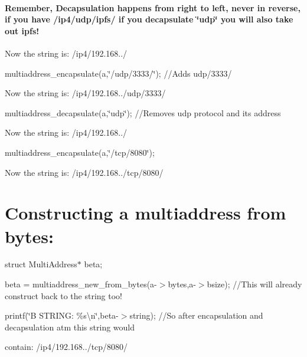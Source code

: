 \paragraph*{Remember, Decapsulation happens from right to left, never in reverse, if you have /ip4/udp/ipfs/ if you decapsulate \char`\"{}udp\char`\"{} you will also take out ipfs!}


\begin{DoxyItemize}
\item Now the string is\+: /ip4/192.168../
\item multiaddress\+\_\+encapsulate(a,\char`\"{}/udp/3333/\char`\"{}); //\+Adds udp/3333/
\item Now the string is\+: /ip4/192.168../udp/3333/
\item multiaddress\+\_\+decapsulate(a,\char`\"{}udp\char`\"{}); //\+Removes udp protocol and its address
\item Now the string is\+: /ip4/192.168../
\item multiaddress\+\_\+encapsulate(a,\char`\"{}/tcp/8080\char`\"{});
\item Now the string is\+: /ip4/192.168../tcp/8080/
\end{DoxyItemize}

\section*{Constructing a multiaddress from bytes\+:}


\begin{DoxyItemize}
\item struct Multi\+Address$\ast$ beta;
\item beta = multiaddress\+\_\+new\+\_\+from\+\_\+bytes(a-\/$>$bytes,a-\/$>$bsize); //\+This will already construct back to the string too!
\item printf(\char`\"{}\+B S\+T\+R\+I\+N\+G\+: \%s\textbackslash{}n\char`\"{},beta-\/$>$string); //\+So after encapsulation and decapsulation atm this string would
\item contain\+: /ip4/192.168../tcp/8080/ 
\end{DoxyItemize}